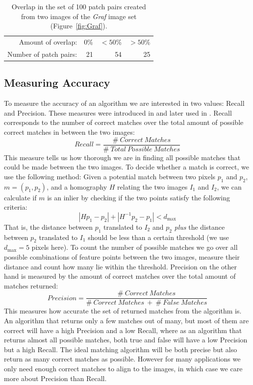 \begin{table}[htb]
\caption{Overlap in the set of 100 patch pairs created from two images 
of the \emph{Graf} image set (Figure~\ref{fig:Graf}).}
\label{table:overlap}
    \centering
\begin{tabular}{r*{3}{r}}
\hline
    Amount of overlap: & 0\% & $< 50$\% & $> 50$\%  \\
    \noalign{\smallskip}
    Number of patch pairs: & 21 & 54 & 25 \\
    \hline
\end{tabular}
\end{table}

\subsection{Measuring Accuracy}

To measure the accuracy of an algorithm we are interested in two values:
Recall and Precision. These measures were introduced in \cite{ke2004pca}
and later used in \cite{mikolajczyk2005performance}. Recall corresponds 
to the number of correct matches over the total amount of possible 
correct matches in between the two images:
\begin{equation*}
	Recall = \frac{\# ~ Correct ~ Matches}{\# ~ Total ~ Possible ~ 
	Matches}
\end{equation*}
This measure tells us how thorough we are in finding all possible 
matches that could be made between the two images. To decide whether a 
match is correct, we use the following method:
Given a potential match between two pixels $p_1$ and $p_2$, $m = 
\left(p_1, p_2\right)$, and a homography $H$ relating the two images 
$I_1$ and $I_2$, we can calculate if $m$ is an inlier by checking if the 
two points satisfy the following criteria:
\begin{equation*}
\left\vert H p_1 - p_2 \right\vert + \left\vert H^{-1}p_2 - p_1 \right\vert < d_{\max}
\end{equation*}
That is, the distance between $p_1$ translated to $I_2$ and $p_2$ 
\emph{plus} the distance between $p_2$ translated to $I_1$ should be 
less than a certain threshold (we use $d_{\max}=5$ pixels here). To 
count the number of possible matches we go over all possible 
combinations of feature points between the two images, measure their 
distance and count how many lie within the threshold.
Precision on the other hand is measured by the amount of correct matches
over the total amount of matches returned:
\begin{equation*}
	Precision = \frac{\# ~ Correct ~ Matches}{\# ~ Correct ~ Matches ~ + 
	~ \# ~ False ~ Matches}
\end{equation*}
This measures how accurate the set of returned matches from the 
algorithm is. An algorithm that returns only a few matches out of many, 
but most of them are correct will have a high Precision and a low 
Recall, where as an algorithm that returns almost all possible matches, 
both true and false will have a low Precision but a high Recall. The 
ideal matching algorithm will be both precise but also return as many 
correct matches as possible. However for many applications we only need 
enough correct matches to align to the images, in which case we care 
more about Precision than Recall. 
%
